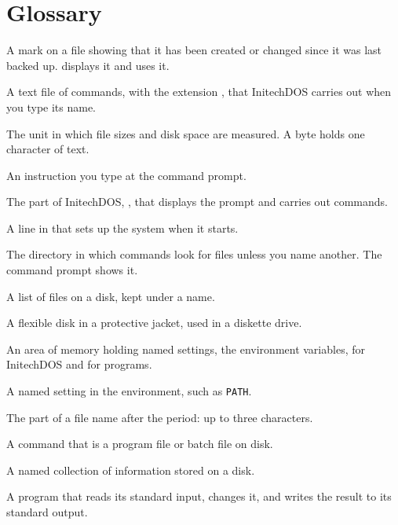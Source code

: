 \chapter{Glossary}

A mark on a file showing that it has been
created or changed since it was last backed up.   displays it
and  uses it.

A text file of commands, with the extension
, that InitechDOS carries out when you type its name.

The unit in which file sizes and disk space are measured.  A
byte holds one character of text.

An instruction you type at the command prompt.

The part of InitechDOS, ,
that displays the prompt and carries out commands.

A line in  that sets up
the system when it starts.

The directory in which commands look for files
unless you name another.  The command prompt shows it.

A list of files on a disk, kept under a name.

A flexible disk in a protective jacket, used in a
diskette drive.

An area of memory holding named settings, the
environment variables, for InitechDOS and for programs.

A named setting in the environment, such as
\texttt{PATH}.

The part of a file name after the period: up to three
characters.

A command that is a program file or batch file
on disk.

A named collection of information stored on a disk.

A program that reads its standard input, changes it, and
writes the result to its standard output.

